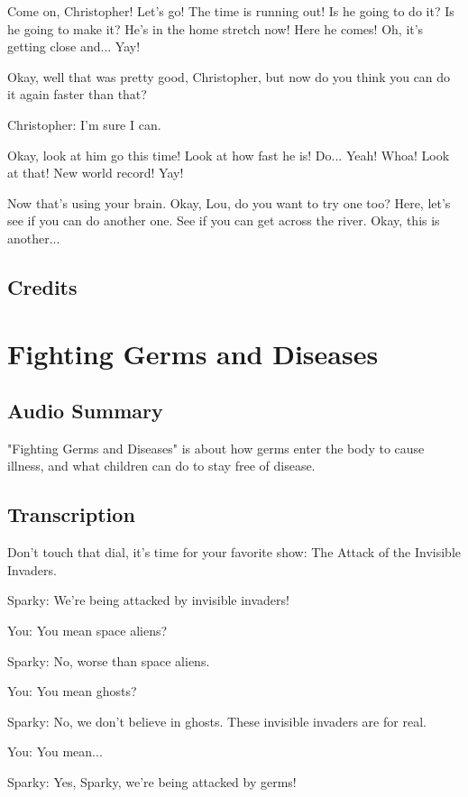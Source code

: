 Come on, Christopher! Let's go! The time is running out! Is he going to do it? Is he going to make it? He's in the home stretch now! Here he comes! Oh, it's getting close and... Yay!

Okay, well that was pretty good, Christopher, but now do you think you can do it again faster than that?

Christopher: I'm sure I can.

Okay, look at him go this time! Look at how fast he is! Do... Yeah! Whoa! Look at that! New world record! Yay!

Now that's using your brain. Okay, Lou, do you want to try one too? Here, let's see if you can do another one. See if you can get across the river. Okay, this is another...

\subsection{Credits}

\section{Fighting Germs and Diseases}

\subsection{Audio Summary}

"Fighting Germs and Diseases" is about how germs enter the body to cause illness, and what children can do to stay free of disease.

\subsection{Transcription}

Don't touch that dial, it's time for your favorite show: The Attack of the Invisible Invaders.

Sparky: We're being attacked by invisible invaders!

You: You mean space aliens?

Sparky: No, worse than space aliens.

You: You mean ghosts?

Sparky: No, we don't believe in ghosts. These invisible invaders are for real.

You: You mean...

Sparky: Yes, Sparky, we're being attacked by germs!

